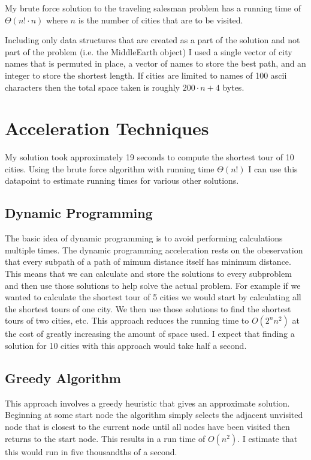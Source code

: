 \documentclass{article}
\begin{document}
My brute force solution to the traveling salesman problem has a running time of $\Theta(n!\cdot n)$ where $n$ is the number of cities that are to be visited. 

Including only data structures that are created as a part of the solution and not part of the problem (i.e. the MiddleEarth object) I used a single vector of city names that is permuted in place, a vector of names to store the best path, and an integer to store the shortest length. If cities are limited to names of 100 ascii characters then the total space taken is roughly $200\cdot n + 4$ bytes. 

\section{Acceleration Techniques}
My solution took approximately 19 seconds to compute the shortest tour of 10 cities. Using the brute force algorithm with running time $\Theta(n!)$ I can use this datapoint to estimate running times for various other solutions.

\subsection{Dynamic Programming}
The basic idea of dynamic programming is to avoid performing calculations multiple times.
The dynamic programming acceleration rests on the obeservation that every subpath of a path of mimum distance itself has minimum distance. This means that we can calculate and store the solutions to every subproblem and then use those solutions to help solve the actual problem. For example if we wanted to calculate the shortest tour of 5 cities we would start by calculating all the shortest tours of one city. We then use those solutions to find the shortest tours of two cities, etc. This approach reduces the running time to $O(2^nn^2)$ at the cost of greatly increasing the amount of space used. I expect that finding a solution for 10 cities with this approach would take half a second.

\subsection{Greedy Algorithm}
This approach involves a greedy heuristic that gives an approximate solution. Beginning at some start node the algorithm simply selects the adjacent unvisited node that is closest to the current node until all nodes have been visited then returns to the start node. This results in a run time of $O(n^2)$. I estimate that this would run in five thousandths of a second.
\end{document}

